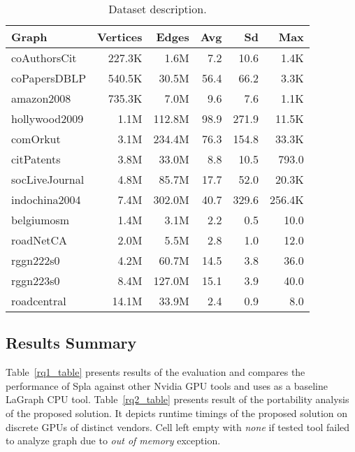 \begin{table}[tbp]
\caption{Dataset description.} 
\begin{center}
    \begin{tabular}{|l|r|r|r|r|r|}
    \hline
    Graph&Vertices&Edges&Avg&Sd&Max\\
    \hline
    \hline
    coAuthorsCit&227.3K&1.6M&7.2&10.6&1.4K\\
    coPapersDBLP&540.5K&30.5M&56.4&66.2&3.3K\\
    amazon2008&735.3K&7.0M&9.6&7.6&1.1K\\
    hollywood2009&1.1M&112.8M&98.9&271.9&11.5K\\
    comOrkut&3.1M&234.4M&76.3&154.8&33.3K\\
    citPatents&3.8M&33.0M&8.8&10.5&793.0\\
    socLiveJournal&4.8M&85.7M&17.7&52.0&20.3K\\
    indochina2004&7.4M&302.0M&40.7&329.6&256.4K\\
    \hline
    belgiumosm&1.4M&3.1M&2.2&0.5&10.0\\
    roadNetCA&2.0M&5.5M&2.8&1.0&12.0\\
    rggn222s0&4.2M&60.7M&14.5&3.8&36.0\\
    rggn223s0&8.4M&127.0M&15.1&3.9&40.0\\
    roadcentral&14.1M&33.9M&2.4&0.9&8.0\\
    \hline
    \end{tabular}
    \label{dataset:info}
\end{center}
\end{table}

\subsection{Results Summary}

Table~\ref{rq1_table} presents results of the evaluation and compares the performance of Spla against other Nvidia GPU tools and uses as a baseline LaGraph CPU tool. 
Table~\ref{rq2_table} presents result of the portability analysis of the proposed solution. It depicts runtime timings of the proposed solution on discrete GPUs of distinct vendors.
Cell left empty with \textit{none} if tested tool failed to analyze graph due to \textit{out of memory} exception.\\


